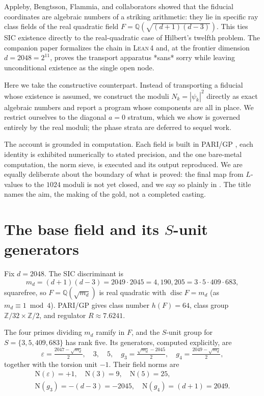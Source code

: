 \documentclass[12pt,a4paper]{article}
\newcommand{\Fd}{F}
\newcommand{\md}{m_d}
\newcommand{\Norm}{\mathrm{N}}
\newcommand{\Lean}{\textsc{Lean\,4}}
\begin{document}
Appleby, Bengtsson, Flammia, and collaborators
\cite{Appleby2013,Appleby2017,AFMY2020} showed that the fiducial coordinates
are algebraic numbers of a striking arithmetic: they lie in specific ray class
fields of the real quadratic field $\Fd = \mathbb{Q}(\sqrt{(d+1)(d-3)})$.  This
ties SIC existence directly to the real-quadratic case of Hilbert's twelfth
problem.  The companion paper \cite{StarkHilbert12} formalizes the chain in
\Lean{} and, at the frontier dimension $d=2048=2^{11}$, proves the transport
apparatus *sans* sorry while leaving unconditional existence as the single open
node.

Here we take the constructive counterpart.  Instead of transporting a fiducial
whose existence is assumed, we construct the moduli $N_k = |\psi_k|^2$ directly
as exact algebraic numbers and report a program whose components are all in
place.  We restrict ourselves to the diagonal $a=0$ stratum, which we show is
governed entirely by the real moduli; the phase strata are deferred to sequel
work.

The account is grounded in computation.  Each field is built in PARI/GP
\cite{PARI}, each identity is exhibited numerically to stated precision, and
the one bare-metal computation, the norm sieve, is executed and its output
reproduced.  We are equally deliberate about the boundary of what is proved: the
final map from $L$-values to the $1024$ moduli is not yet closed, and we say so
plainly in .  The title names the aim, the making of the gold,
not a completed casting.

\section{The base field and its $S$-unit generators}
\label{sec:base}

Fix $d=2048$.  The SIC discriminant is
\[
\md = (d+1)(d-3) = 2049\cdot 2045 = 4{,}190{,}205 = 3\cdot 5\cdot 409\cdot 683,
\]
squarefree, so $\Fd=\mathbb{Q}(\sqrt{\md})$ is real quadratic with
$\operatorname{disc}\Fd = \md$ (as $\md\equiv 1 \bmod 4$).  PARI/GP gives class
number $h(\Fd)=64$, class group $\mathbb{Z}/32\times\mathbb{Z}/2$, and
regulator $R \approx 7.6241$.

The four primes dividing $\md$ ramify in $\Fd$, and the $S$-unit group for
$S = \{3,5,409,683\}$ has rank five.  Its generators, computed explicitly, are
\[
\varepsilon = \tfrac{2047 - \sqrt{\md}}{2},\quad
3,\quad 5,\quad
g_3 = \tfrac{\sqrt{\md}-2045}{2},\quad
g_4 = \tfrac{2049-\sqrt{\md}}{2},
\]
together with the torsion unit $-1$.  Their field norms are
\[
\begin{gathered}
\Norm(\varepsilon)=+1,\quad
\Norm(3)=9,\quad
\Norm(5)=25,\\
\Norm(g_3)=-(d-3)=-2045,\quad
\Norm(g_4)=(d+1)=2049 .
\end{gathered}
\]
\end{document}
